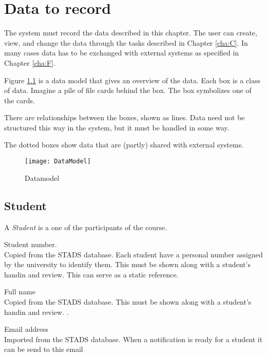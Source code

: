 \documentclass[Main]{subfiles}
\begin{document}
\chapter{Data to record}
The system must record the data described in this chapter. The user can create, view, and change the data through the tasks described in Chapter \ref{cha:C}. 
In many cases data has to be exchanged with external systems as specified in Chapter \ref{cha:F}.

Figure \ref{fig:Datamodel} is a data model that gives an overview of the data. 
Each box is a class of data. 
Imagine a pile of file cards behind the box. 
The box symbolizes one of the cards. 

There are relationships between the boxes, shown as lines.
Data need not be structured this way in the system, but it must be handled in some way. 

The dotted boxes show data that are (partly) shared with external systems. 

\begin{figure}[hbtp]
\centering
\texttt{[image: DataModel]}
\caption{Datamodel}
\label{fig:Datamodel}
\end{figure}


\newpage

\section{Student}
A \textit{Student} is a one of the participants of the course.
\begin{DataIntro}
\rExample{}
\end{DataIntro}

\begin{DataTable}

\Record
{Student number. 
\\
Copied from the STADS database. Each student have a personal number assigned by the university to identify them. This must be shown along with a student's handin and review. }
{This can serve as a static reference.}
{}

\Record
{Full name\\
Copied from the STADS database.
This must be shown along with a student's handin and review.}
{.}
{}

\Record
{Email address\\
Imported from the STADS database.}
{When a notification is ready for a student it can be send to this email}
{}
\end{DataTable}
\end{document}
